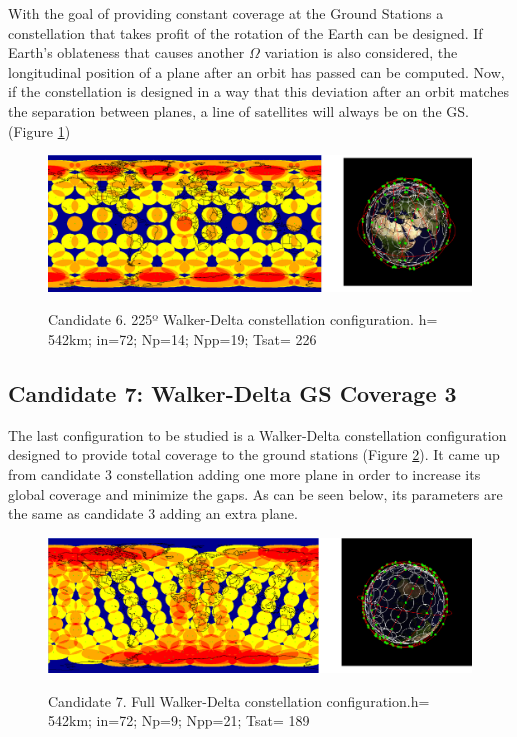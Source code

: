 With the goal of providing constant coverage at the Ground Stations a constellation that takes profit of the rotation of the Earth can be designed. If Earth's oblateness that causes another $\Omega$ variation  is also considered, the longitudinal position of a plane after an orbit has passed can be computed. Now, if the constellation is designed in a way that this deviation after an orbit matches the separation between planes, a line of satellites will always be on the GS. (Figure \ref{fig:Candidate6})

\begin{figure}%
	\centering
	\includegraphics[width=1\textwidth]{Candidate6.png}\\
	\caption{Candidate 6. 225º Walker-Delta constellation configuration. h= 542km; in=72; Np=14; Npp=19; Tsat= 226}
	\label{fig:Candidate6}
\end{figure}

\subsection{Candidate 7: Walker-Delta GS Coverage 3}

The last configuration to be studied is a Walker-Delta constellation configuration designed to provide total coverage to the ground stations (Figure \ref{fig:Candidate7}). It came up from candidate 3 constellation adding one more plane in order to increase its global coverage and minimize the gaps. As can be seen below, its parameters are the same as candidate 3 adding an extra plane.

\begin{figure}%
	\centering
	\includegraphics[width=1\textwidth]{Candidate7.png}\\
	\caption{Candidate 7. Full Walker-Delta constellation configuration.h= 542km; in=72; Np=9; Npp=21; Tsat= 189}
	\label{fig:Candidate7}
\end{figure}

